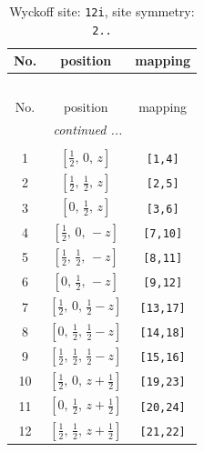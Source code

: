 \documentclass[fleqn,8pt]{jsarticle}
\begin{document}
\begin{longtable}{ccc}
\caption{Wyckoff site: {\tt 12i}, site symmetry: {\tt 2..}}
 \\
 \hline \hline
No. & position & mapping \\ \hline \endfirsthead

\multicolumn{2}{l}{\tablename\ \thetable{}} \\
 \hline \hline
No. & position & mapping \\ \hline \endhead

 \hline \hline
\multicolumn{2}{r}{\footnotesize\it continued ...} \\ \endfoot

 \hline \hline
\multicolumn{2}{r}{} \\ \endlastfoot

1 & $\left[ \frac{1}{2},\, 0,\, z \right]$ & {\tt [1,4]} \\ \hline
2 & $\left[ \frac{1}{2},\, \frac{1}{2},\, z \right]$ & {\tt [2,5]} \\ \hline
3 & $\left[ 0,\, \frac{1}{2},\, z \right]$ & {\tt [3,6]} \\ \hline
4 & $\left[ \frac{1}{2},\, 0,\, - z \right]$ & {\tt [7,10]} \\ \hline
5 & $\left[ \frac{1}{2},\, \frac{1}{2},\, - z \right]$ & {\tt [8,11]} \\ \hline
6 & $\left[ 0,\, \frac{1}{2},\, - z \right]$ & {\tt [9,12]} \\ \hline
7 & $\left[ \frac{1}{2},\, 0,\, \frac{1}{2} - z \right]$ & {\tt [13,17]} \\ \hline
8 & $\left[ 0,\, \frac{1}{2},\, \frac{1}{2} - z \right]$ & {\tt [14,18]} \\ \hline
9 & $\left[ \frac{1}{2},\, \frac{1}{2},\, \frac{1}{2} - z \right]$ & {\tt [15,16]} \\ \hline
10 & $\left[ \frac{1}{2},\, 0,\, z + \frac{1}{2} \right]$ & {\tt [19,23]} \\ \hline
11 & $\left[ 0,\, \frac{1}{2},\, z + \frac{1}{2} \right]$ & {\tt [20,24]} \\ \hline
12 & $\left[ \frac{1}{2},\, \frac{1}{2},\, z + \frac{1}{2} \right]$ & {\tt [21,22]} \\
\end{longtable}
\renewcommand{\arraystretch}{1.2}
\end{document}
